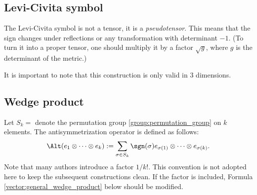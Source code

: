 \subsection{Levi-Civita symbol}

    \begin{remark}[Pseudotensor]\label{vector:levi_civita_pseudotensor}
        The Levi-Civita symbol is not a tensor, it is a \textit{pseudotensor}. This means that the sign changes under reflections or any transformation with determinant $-1$. (To turn it into a proper tensor, one should multiply it by a factor $\sqrt{g}$, where $g$ is the determinant of the metric.)
    \end{remark}

    \begin{remark}
        It is important to note that this construction is only valid in 3 dimensions.
    \end{remark}

\subsection{Wedge product}\label{section:wedge_product}

    \begin{definition}[Antisymmetrization]\label{vector:antisymmetrization}
        Let $S_k=$ denote the permutation group \ref{group:permutation_group} on $k$ elements. The antisymmetrization operator is defined as follows:
        \begin{gather}
            \Alt(e_1\otimes\cdots\otimes e_k) := \sum_{\sigma\in S_k} \sgn(\sigma)e_{\sigma(1)}\otimes\cdots\otimes e_{\sigma(k)}.
        \end{gather}
        Note that many authors introduce a factor $1/k!$. This convention is not adopted here to keep the subsequent constructions clean. If the factor is included, Formula \ref{vector:general_wedge_product} below should be modified.
    \end{definition}

